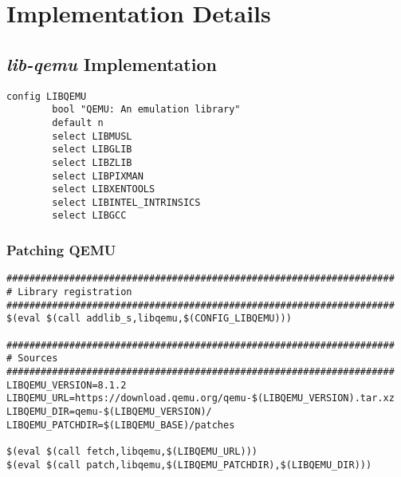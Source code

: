 \chapter{Implementation Details}
\label{chapter:implementation-details}



\section{\textit{lib-qemu} Implementation}
\label{sec:lib-qemu-impl}

\begin{lstlisting}
config LIBQEMU
        bool "QEMU: An emulation library"
        default n
        select LIBMUSL
        select LIBGLIB
        select LIBZLIB
        select LIBPIXMAN
        select LIBXENTOOLS
        select LIBINTEL_INTRINSICS
        select LIBGCC
\end{lstlisting}

\subsection{Patching QEMU}
\label{subsec:patching-qemu}

\begin{lstlisting}
####################################################################
# Library registration
####################################################################
$(eval $(call addlib_s,libqemu,$(CONFIG_LIBQEMU)))
    
####################################################################
# Sources
####################################################################
LIBQEMU_VERSION=8.1.2
LIBQEMU_URL=https://download.qemu.org/qemu-$(LIBQEMU_VERSION).tar.xz
LIBQEMU_DIR=qemu-$(LIBQEMU_VERSION)/
LIBQEMU_PATCHDIR=$(LIBQEMU_BASE)/patches
    
$(eval $(call fetch,libqemu,$(LIBQEMU_URL)))
$(eval $(call patch,libqemu,$(LIBQEMU_PATCHDIR),$(LIBQEMU_DIR)))
\end{lstlisting}

